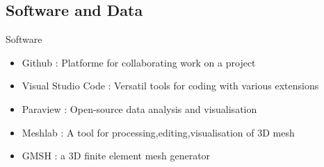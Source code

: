 \documentclass[10pt]{beamer}
\begin{document}
\subsection{Software and Data}
\begin{frame}{Software}
    \begin{itemize}
        \item Github : Platforme for collaborating work on a project
        \item Visual Studio Code : Versatil tools for coding with various extensions
        \item Paraview : Open-source data analysis and visualisation
        \item Meshlab : A tool for processing,editing,visualisation of 3D mesh
        \item GMSH : a 3D finite element mesh generator
    \end{itemize}

\end{frame}
\end{document}
